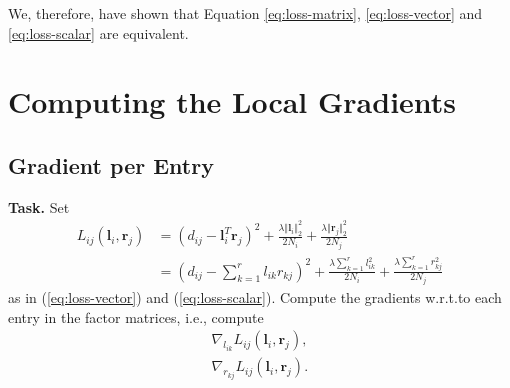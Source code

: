 \documentclass{support/acm_proc_article-sp}
\begin{document}
    We, therefore, have shown that Equation \ref{eq:loss-matrix}, \ref{eq:loss-vector} and
    \ref{eq:loss-scalar} are equivalent.


    \section{Computing the Local Gradients}


    \subsection{Gradient per Entry}
    \label{subsec:gradient-entry}

    \textbf{Task.} Set
    \begin{equation*}
        \begin{aligned}
            L_{ij}(\mathbf{l}_i,\mathbf{r}_j) & = (d_{ij} - \mathbf{l}_i^T \mathbf{r}_j)^2
                                                + \frac{\lambda \Vert \mathbf{l}_i \Vert_2^2}{2N_i}
                                                + \frac{\lambda \Vert \mathbf{r}_j \Vert_2^2}{2N_j} \\
                                              & = \left(d_{ij} - \sum_{k=1}^r l_{ik}r_{kj} \right)^2
                                                + \frac{\lambda\sum_{k=1}^r l_{ik}^2}{2N_i}
                                                + \frac{\lambda\sum_{k=1}^r r_{kj}^2}{2N_j}
        \end{aligned}
    \end{equation*}
    as in (\ref{eq:loss-vector}) and (\ref{eq:loss-scalar}).
    Compute the gradients w.r.t.\@ to each entry in the factor matrices, i.e.\@, compute
    \begin{equation*}
        \begin{aligned}
            \nabla_{l_{ik}}L_{ij}(\mathbf{l}_i,\mathbf{r}_j),\\
            \nabla_{r_{kj}}L_{ij}(\mathbf{l}_i,\mathbf{r}_j).
        \end{aligned}
    \end{equation*}
\end{document}
